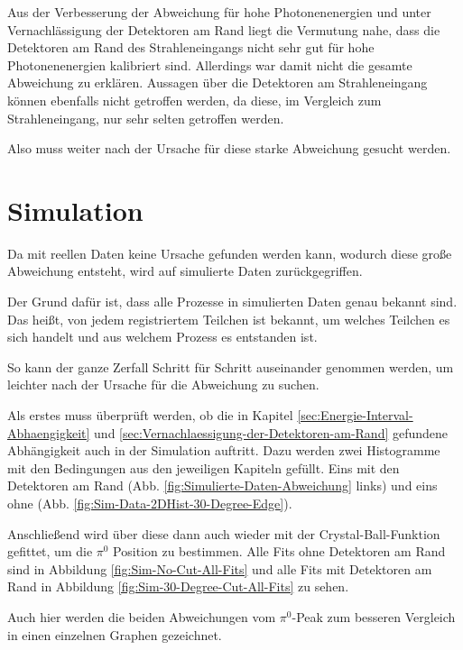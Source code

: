 \documentclass[a4paper,11pt,oneside,final,german,openbib,pdftex]{scrbook}
\begin{document}
{Aus der Verbesserung der Abweichung f\"ur hohe Photonenenergien und unter Vernachl\"assigung der Detektoren am Rand liegt die Vermutung nahe, dass die Detektoren am Rand des Strahleneingangs nicht sehr gut f\"ur hohe Photonenenergien kalibriert sind. 
Allerdings war damit nicht die gesamte Abweichung zu erkl\"aren. 
Aussagen \"uber die Detektoren am Strahleneingang k\"onnen ebenfalls nicht getroffen werden, da diese, im Vergleich zum Strahleneingang, nur sehr selten getroffen werden.

Also muss weiter nach der Ursache f\"ur diese starke Abweichung gesucht werden.



\section{Simulation}
\label{sec:Simulation}

Da mit reellen Daten keine Ursache gefunden werden kann, wodurch diese gro{\ss}e Abweichung entsteht, wird auf simulierte Daten zur\"uckgegriffen. 

Der Grund daf\"ur ist, dass alle Prozesse in simulierten Daten genau bekannt sind. Das hei{\ss}t, von jedem registriertem Teilchen ist bekannt, um welches Teilchen es sich handelt und aus welchem Prozess es entstanden ist. 

So kann der ganze Zerfall Schritt f\"ur Schritt auseinander genommen werden, um leichter nach der Ursache f\"ur die Abweichung zu suchen.

Als erstes muss \"uberpr\"uft werden, ob die in Kapitel \ref{sec:Energie-Interval-Abhaengigkeit} und \ref{sec:Vernachlaessigung-der-Detektoren-am-Rand} gefundene Abh\"angigkeit auch in der Simulation auftritt. 
Dazu werden zwei Histogramme mit den Bedingungen aus den jeweiligen Kapiteln gef\"ullt. Eins mit den Detektoren am Rand (Abb. \ref{fig:Simulierte-Daten-Abweichung} links) und eins ohne (Abb. \ref{fig:Sim-Data-2DHist-30-Degree-Edge}).

Anschlie{\ss}end wird \"uber diese dann auch wieder mit der Crystal-Ball-Funktion gefittet, um die $\pi^0$ Position zu bestimmen. Alle Fits ohne Detektoren am Rand sind in Abbildung \ref{fig:Sim-No-Cut-All-Fits} und alle Fits mit Detektoren am Rand in Abbildung \ref{fig:Sim-30-Degree-Cut-All-Fits} zu sehen.

Auch hier werden die beiden Abweichungen vom $\pi^0$-Peak zum besseren Vergleich in einen einzelnen Graphen gezeichnet.

}
\end{document}
